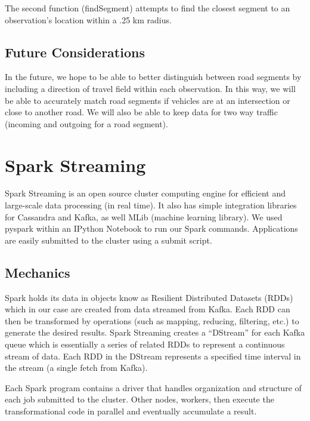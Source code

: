 \documentclass{vldb}
\begin{document}


The second function (findSegment) attempts to find the closest segment to an observation’s location within a .25 km radius.



\subsection{Future Considerations}

In the future, we hope to be able to better distinguish between road segments by including a direction of travel field within each observation. In this way, we will be able to accurately match road segments if vehicles are at an intersection or close to another road. We will also be able to keep data for two way traffic (incoming and outgoing for a road segment). 


\section{Spark Streaming}
Spark Streaming is an open source cluster computing engine for efficient and large-scale data processing (in real time). It also has simple integration libraries for Cassandra and Kafka, as well MLib (machine learning library). We used pyspark within an IPython Notebook to run our Spark commands. Applications are easily submitted to the cluster using a submit script.

\subsection{Mechanics}
Spark holds its data in objects know as Resilient Distributed Datasets (RDDs) which in our case are created from data streamed from Kafka. Each RDD can then be transformed by operations (such as mapping, reducing, filtering, etc.) to generate the desired results. Spark Streaming creates a “DStream” for each Kafka queue which is essentially a series of related RDDs to represent a continuous stream of data. Each RDD in the DStream represents a specified time interval in the stream (a single fetch from Kafka). 

Each Spark program contains a driver that handles organization and structure of each job submitted to the cluster. Other nodes, workers, then execute the transformational code in parallel and eventually accumulate a result. 
\end{document}
